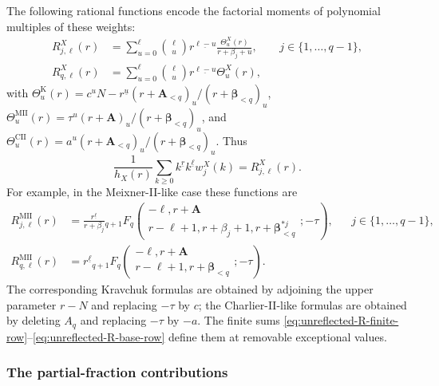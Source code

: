 \documentclass[10pt]{amsart}
\newcommand{\A}{\boldsymbol A}
\newcommand{\bbeta}{\boldsymbol\beta}
\newcommand{\fall}[2]{#1^{\underline{#2}}}
\newcommand{\pFq}[5]{{}_{#1}F_{#2}\!\left(\begin{matrix}#3\\#4\end{matrix};#5\right)}
\theoremstyle{plain}
\theoremstyle{definition}
\theoremstyle{remark}
\begin{document}
The following rational functions encode the factorial moments of polynomial
multiples of these weights:
\begin{align}
 R_{j,\ell}^X(r)
 &=\sum_{u=0}^{\ell}\binom\ell u\fall{r}{\ell-u}
   \frac{\Theta_u^X(r)}{r+\beta_j+u},&&
   j\in\{1,\ldots,q-1\},
 \label{eq:unreflected-R-finite-row}\\
 R_{q,\ell}^X(r)
 &=\sum_{u=0}^{\ell}\binom\ell u\fall{r}{\ell-u}
   \Theta_u^X(r),
 \label{eq:unreflected-R-base-row}
\end{align}
with
\(\Theta_u^{\mathrm K}(r)=c^u\fall{N-r}{u}
(r+\A_{<q})_u/(r+\bbeta_{<q})_u\),
\(\Theta_u^{\mathrm{MII}}(r)=\tau^u(r+\A)_u/(r+\bbeta_{<q})_u\), and
\(\Theta_u^{\mathrm{CII}}(r)=a^u(r+\A_{<q})_u/(r+\bbeta_{<q})_u\).
Thus
\begin{equation}
 \frac1{h_X(r)}\sum_{k\ge0}\fall{k}{r}\fall{k}{\ell}w_j^X(k)
 =R_{j,\ell}^X(r).
 \label{eq:unreflected-R-pairing}
\end{equation}
For example, in the Meixner-II-like case these functions are
\begin{align*}
 R_{j,\ell}^{\mathrm{MII}}(r)
 &=\frac{\fall{r}{\ell}}{r+\beta_j}
 \pFq{q+1}{q}
 {-\ell,r+\A}
 {r-\ell+1,r+\beta_j+1,r+\bbeta_{<q}^{*j}}{-\tau},
 &&j\in\{1,\ldots,q-1\},\\
 R_{q,\ell}^{\mathrm{MII}}(r)
 &=\fall{r}{\ell}
 \pFq{q+1}{q}
 {-\ell,r+\A}
 {r-\ell+1,r+\bbeta_{<q}}{-\tau}.
\end{align*}
The corresponding Kravchuk formulas are obtained by adjoining the upper
parameter \(r-N\) and replacing \(-\tau\) by \(c\); the
Charlier-II-like formulas are obtained by deleting \(A_q\) and
replacing \(-\tau\) by \(-a\).  The finite sums
\eqref{eq:unreflected-R-finite-row}--\eqref{eq:unreflected-R-base-row}
define them at removable exceptional values.

\subsubsection{The partial-fraction contributions}
\end{document}
